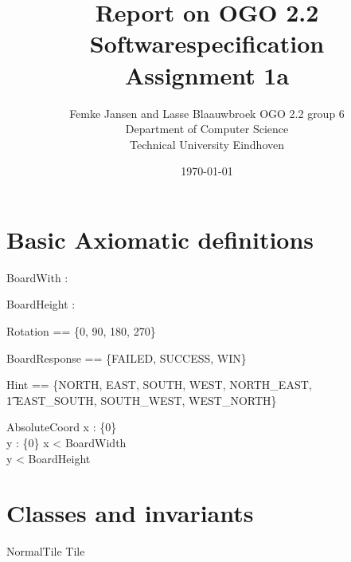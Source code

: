 \documentclass[12pt]{article}
\title{Report on OGO 2.2 Softwarespecification\\ Assignment 1a}
\author{
        Femke Jansen and Lasse Blaauwbroek OGO 2.2 group 6 \\
                Department of Computer Science\\
        Technical University Eindhoven\\
}
\date{\today}
\begin{document}
\maketitle

\begin{abstract}

\end{abstract}

\section{Basic Axiomatic definitions}

\begin{axdef}
[Null]
\end{axdef}

\begin{axdef}
BoardWith : \nat
\end{axdef}

\begin{axdef}
BoardHeight : \nat
\end{axdef}

\begin{axdef}
Rotation == \{0, 90, 180, 270\}
\end{axdef}

\begin{axdef}
BoardResponse == \{FAILED, SUCCESS, WIN\}
\end{axdef}

\begin{axdef}
Hint == \{NORTH, EAST, SOUTH, WEST, NORTH\_EAST, \\ \t1 EAST\_SOUTH, SOUTH\_WEST, WEST\_NORTH\}
\end{axdef}

\begin{schema}{AbsoluteCoord}
x : \nat \cup \{0\} \\
y : \nat \cup \{0\}
\where
x < BoardWidth \\
y < BoardHeight
\end{schema}


\section{Classes and invariants}

\begin{schema}{NormalTile}
Tile
\end{schema}
\end{document}
